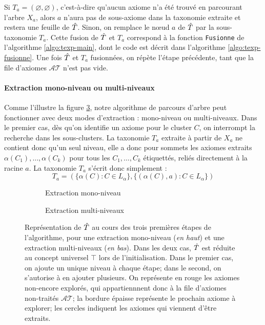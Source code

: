 Si $T_a = (\varnothing, \varnothing)$, c'est-à-dire qu'aucun axiome n'a été trouvé en parcourant l'arbre $X_a$, alors $a$ n'aura pas de sous-axiome dans la taxonomie extraite et restera une feuille de $\hat{T}$. Sinon, on remplace le nœud $a$ de $\hat{T}$ par la sous-taxonomie $T_a$. Cette fusion de $\hat{T}$ et $T_a$ correspond à la fonction \texttt{Fusionne} de l'algorithme \ref{algo:texp-main}, dont le code est décrit dans l'algorithme \ref{algo:texp-fusionne}. Une fois $\hat{T}$ et $T_a$ fusionnées, on répète l'étape précédente, tant que la file d'axiomes $\mathcal{AT}$ n'est pas vide.

\paragraph{Extraction mono-niveau ou multi-niveaux}


Comme l'illustre la figure \ref{fig:texp-tree-expansion}, notre algorithme de parcours d'arbre peut fonctionner avec deux modes d'extraction : mono-niveau ou multi-niveaux. Dans le premier cas, dès qu'on identifie un axiome pour le cluster $C$, on interrompt la recherche dans les sous-clusters. La taxonomie $T_a$ extraite à partir de $X_a$ ne contient donc qu'un seul niveau, elle a donc pour sommets les axiomes extraits $\alpha(C_1), \ldots, \alpha(C_k)$ pour tous les $C_1, \ldots, C_k$ étiquettés, reliés directement à la racine $a$. La taxonomie $T_a$ s'écrit donc simplement :
\begin{equation}
    T_a = ( \{ \alpha(C) : C \in L_\alpha \}, \{ (\alpha(C), a) : C \in L_\alpha \} )
\end{equation}

\begin{figure}[h]
    \centering
    
    \begin{subfigure}{\textwidth}
        \centering
        
        \caption{Extraction mono-niveau}
        \label{subfig:tree-singlelevel}
    \end{subfigure}
    
    \begin{subfigure}{\textwidth}
        \centering
        
        \caption{Extraction multi-niveaux}
        \label{subfig:tree-multilevel}
    \end{subfigure}
    
    \caption[Extraction mono-niveau et extraction multi-niveaux]{Représentation de $\hat{T}$ au cours des trois premières étapes de l'algorithme, pour une extraction mono-niveau (\textit{en haut}) et une extraction multi-niveaux (\textit{en bas}). Dans les deux cas, $\hat{T}$ est réduite au concept universel $\top$ lors de l'initialisation. Dans le premier cas, on ajoute un unique niveau à chaque étape; dans le second, on s'autorise à en ajouter plusieurs. On représente en rouge les axiomes non-encore explorés, qui appartiennnent donc à la file d'axiomes non-traités $\mathcal{AT}$; la bordure épaisse représente le prochain axiome à explorer; les cercles indiquent les axiomes qui viennent d'être extraits.}
    \label{fig:texp-tree-expansion}
\end{figure}


